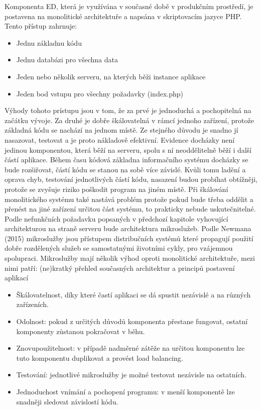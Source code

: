 \documentclass[12pt]{article}
\begin{document}
    Komponenta ED, která je využívána v současné době v produkčním prostředí, je postavena
    na monolitické architektuře a napsána v skriptovacím jazyce PHP. Tento přístup zahrnuje:
    \begin{itemize}
        \item Jednu základnu kódu
        \item Jednu databázi pro všechna data
        \item Jeden nebo několik serveru, na kterých běži instance aplikace
        \item Jeden bod vstupu pro všechny požadavky (index.php)
    \end{itemize}

    Výhody tohoto prístupu jsou v tom, že za prvé je jednoduchá a pochopitelná na
    začátku vývoje. Za druhé je dobře škálovatelná v rámcí jednoho zařízení, protože základná
    kódu se nachází na jednom místě. Ze stejného důvodu je snadno jí nasazovat, testovat a je
    proto nákladově efektivní.
    Evidence docházky není jedinou komponentou, která běží na serveru, spolu s ní
    neoddělitelně běží i další částí aplikace. Během času kódová základna informačního systému
    docházky se bude rozšiřovat, částí kódu se stanou na sobě více závislé. Kvůli tomu ladění a
    oprava chyb, testování jednotlivých částí kódu, nasazení budou probíhat obtížněji, protože se
    zvyšuje riziko poškodit program na jiném místě. Při škálování monolitického systému také
    nastává problém protože pokud bude třeba oddělit a přenést na jiné zařízení určitou část
    systému, to prakticky nebude uskutečnitelné.
    Podle nefunkčních požadavku popsaných v předchozí kapitole vyhovující
    architekturou na straně serveru bude architektura mikroslužeb. Podle Newmana (2015) mikroslužby jsou
    přístupem distribučních systémů které propagují použití dobře rozdělených služeb se
    samostatnými životními cykly, pro vzájemnou spolupraci. Mikroslužby mají několik výhod
    oproti monolitické architektuře, mezi nimi patří:
    (ne)kratký přehled současných architektur a principů postavení aplikací
\begin{itemize}
    \item Škálovatelnost, díky které častí aplikaci se dá spustit nezávislé a na různých
    zařízeních.
    \item Odolnost: pokud z určitých důvodů komponenta přestane fungovat, ostatní
    komponenty zůstanou pokračovat v běhu.
    \item Znovupoužitelnost: v případě nadměrné zátěže na určitou komponentu lze tuto
    komponentu duplikovat a provést load balancing.
    \item Testování: jednotlivé mikroslužby je možné testovat nezávisle na ostatních.
    \item Jednoduchost vnímání a pochopení programu: v menší komponentě lze snadněji
    sledovat závislostí kódu.
\end{itemize}
\end{document}

